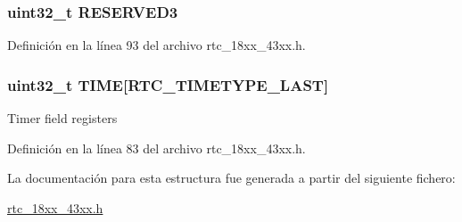 \subsubsection[{\texorpdfstring{R\+E\+S\+E\+R\+V\+E\+D3}{RESERVED3}}]{ uint32\+\_\+t R\+E\+S\+E\+R\+V\+E\+D3}\hypertarget{struct_l_p_c___r_t_c___t_a0dccf23b0301eb78ab61f90a3e6ae594}{}\label{struct_l_p_c___r_t_c___t_a0dccf23b0301eb78ab61f90a3e6ae594}


Definición en la línea 93 del archivo rtc\+\_\+18xx\+\_\+43xx.\+h.

\subsubsection[{\texorpdfstring{T\+I\+ME}{TIME}}]{ uint32\+\_\+t T\+I\+ME\mbox{[}{\bf R\+T\+C\+\_\+\+T\+I\+M\+E\+T\+Y\+P\+E\+\_\+\+L\+A\+ST}\mbox{]}}\hypertarget{struct_l_p_c___r_t_c___t_adbcc88f3936d922774dd670f1c48ce3a}{}\label{struct_l_p_c___r_t_c___t_adbcc88f3936d922774dd670f1c48ce3a}
Timer field registers 

Definición en la línea 83 del archivo rtc\+\_\+18xx\+\_\+43xx.\+h.



La documentación para esta estructura fue generada a partir del siguiente fichero\+:\begin{DoxyCompactItemize}
\item 
\hyperlink{rtc__18xx__43xx_8h}{rtc\+\_\+18xx\+\_\+43xx.\+h}\end{DoxyCompactItemize}
